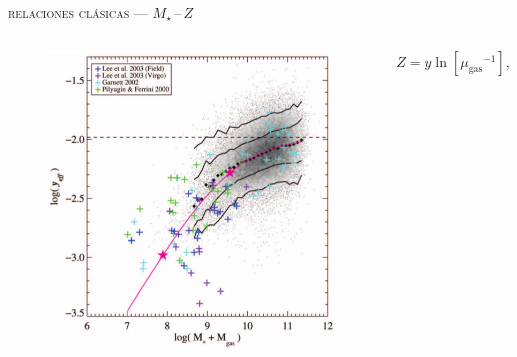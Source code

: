 \documentclass[xcolor=dvipsnames,4pt,hyperref={colorlinks,citecolor=black,linkcolor=black,urlcolor=black}]{beamer}
\begin{document}
\begin{frame}{\textsc{relaciones clásicas --- $M_\star\,$--$\,Z$}}

\begin{columns}
\begin{figure}
\includegraphics[scale=0.7]{img/tremonti2004-8}
\end{figure}


%
$$Z = y\ln{\left[{\mu_\text{gas}}^{-1}\right]},$$
%


\end{columns}
\end{frame}
\end{document}
